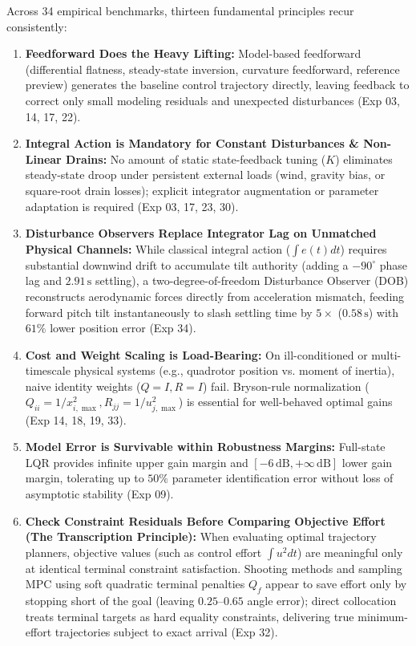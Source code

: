 \documentclass[11pt,a4paper]{article}
\begin{document}
Across 34 empirical benchmarks, thirteen fundamental principles recur consistently:
\begin{enumerate}
  \item \textbf{Feedforward Does the Heavy Lifting:} Model-based feedforward (differential flatness, steady-state inversion, curvature feedforward, reference preview) generates the baseline control trajectory directly, leaving feedback to correct only small modeling residuals and unexpected disturbances (Exp 03, 14, 17, 22).
  \item \textbf{Integral Action is Mandatory for Constant Disturbances \& Non-Linear Drains:} No amount of static state-feedback tuning ($K$) eliminates steady-state droop under persistent external loads (wind, gravity bias, or square-root drain losses); explicit integrator augmentation or parameter adaptation is required (Exp 03, 17, 23, 30).
  \item \textbf{Disturbance Observers Replace Integrator Lag on Unmatched Physical Channels:} While classical integral action ($\int e(t) dt$) requires substantial downwind drift to accumulate tilt authority (adding a $-90^\circ$ phase lag and $2.91\,\text{s}$ settling), a two-degree-of-freedom Disturbance Observer (DOB) reconstructs aerodynamic forces directly from acceleration mismatch, feeding forward pitch tilt instantaneously to slash settling time by $5\times$ ($0.58\,\text{s}$) with $61\%$ lower position error (Exp 34).
  \item \textbf{Cost and Weight Scaling is Load-Bearing:} On ill-conditioned or multi-timescale physical systems (e.g., quadrotor position vs. moment of inertia), naive identity weights ($Q=I, R=I$) fail. Bryson-rule normalization ($Q_{ii} = 1/x_{i,\max}^2, R_{jj} = 1/u_{j,\max}^2$) is essential for well-behaved optimal gains (Exp 14, 18, 19, 33).
  \item \textbf{Model Error is Survivable within Robustness Margins:} Full-state LQR provides infinite upper gain margin and $[-6\,\text{dB}, +\infty\,\text{dB}]$ lower gain margin, tolerating up to $50\%$ parameter identification error without loss of asymptotic stability (Exp 09).
  \item \textbf{Check Constraint Residuals Before Comparing Objective Effort (The Transcription Principle):} When evaluating optimal trajectory planners, objective values (such as control effort $\int u^2 dt$) are meaningful only at identical terminal constraint satisfaction. Shooting methods and sampling MPC using soft quadratic terminal penalties $Q_f$ appear to save effort only by stopping short of the goal (leaving $0.25\text{--}0.65$ angle error); direct collocation treats terminal targets as hard equality constraints, delivering true minimum-effort trajectories subject to exact arrival (Exp 32).

\end{enumerate}
\end{document}
